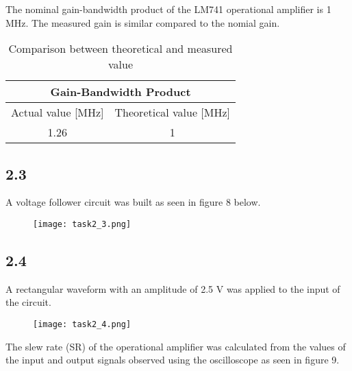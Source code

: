     The nominal gain-bandwidth product of the LM741 operational amplifier is 1 MHz. The measured gain is similar compared to the nomial gain.

    \begin{table}[htbp]
     \centering
       \begin{tabular}{c|c}
        \multicolumn{2}{c}{Gain-Bandwidth Product}\\
        \hline
        Actual value [MHz] & Theoretical value [MHz] \\
       \hline
        1.26          & 1 \\
       \end{tabular}%
     \caption{Comparison between theoretical and measured value}
     \label{tab:addlabel}%
   \end{table}%

\subsection*{2.3}

    A voltage follower circuit was built as seen in figure 8 below.\\
    
    \begin{figure}[h!]
        \centering
        \texttt{[image: task2\_3.png]}
    \end{figure}


\subsection*{2.4}

    A rectangular waveform with an amplitude of 2.5 V was applied to the input of the circuit.\\

    \begin{figure}[h!]
        \centering
        \texttt{[image: task2\_4.png]}
    \end{figure}

    The slew rate (SR) of the operational amplifier was calculated from the values of the input and output signals observed using the oscilloscope as seen in figure 9.

